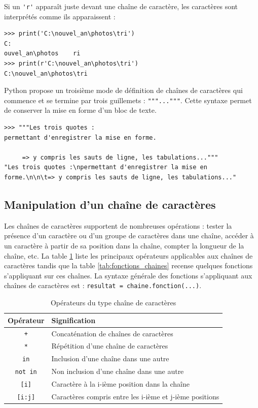 \documentclass[12pt, a4paper]{article}
\begin{document}
Si un \lstinline{'r'} apparaît juste devant une chaîne de caractère, les caractères sont interprétés comme ils apparaissent :
\begin{lstlisting}
>>> print('C:\nouvel_an\photos\tri')
C:
ouvel_an\photos    ri
>>> print(r'C:\nouvel_an\photos\tri')
C:\nouvel_an\photos\tri
\end{lstlisting}

Python propose un troisième mode de définition de chaînes de caractères qui commence et se termine par trois guillemets : \lstinline{"""..."""}. Cette syntaxe permet de conserver la mise en forme d'un bloc de texte.
\begin{lstlisting}
>>> """Les trois quotes :
permettant d'enregistrer la mise en forme.

     => y compris les sauts de ligne, les tabulations..."""
"Les trois quotes :\npermettant d'enregistrer la mise en forme.\n\n\t=> y compris les sauts de ligne, les tabulations..."
\end{lstlisting}


\subsection{Manipulation d'un chaîne de caractères}
Les chaînes de caractères supportent de nombreuses opérations : tester la présence d'un caractère ou d'un groupe de caractères dans une chaîne, accéder à un caractère à partir de sa position dans la chaîne, compter la longueur de la chaîne, etc. La table \ref{tab:operateurs_chaines} liste les principaux opérateurs applicables aux chaînes de caractères tandis que la table \ref{tab:fonctions_chaines} recense quelques fonctions s'appliquant sur ces chaînes. La syntaxe générale des fonctions s'appliquant aux chaînes de caractères est : \lstinline{resultat = chaine.fonction(...)}.

\begin{table}[H]
	\begin{center}
		\begin{tabular}{|c|l|}
			\hline
			\textbf{Opérateur} & \textbf{Signification} \\
			\hline
			\lstinline{+} & Concaténation de chaînes de caractères \\
			\lstinline{*} & Répétition d'une chaîne de caractères \\
			\lstinline{in} & Inclusion d'une chaîne dans une autre \\
			\lstinline{not in} & Non inclusion d'une chaîne dans une autre \\
			\lstinline{[i]} & Caractère à la i-ième position dans la chaîne \\
			\lstinline{[i:j]} & Caractères compris entre les i-ième et j-ième positions \\
			\hline
		\end{tabular}
		\caption{Opérateurs du type chaîne de caractères}
		\label{tab:operateurs_chaines}
	\end{center}
\end{table}
\end{document}
